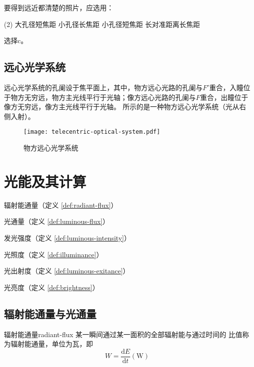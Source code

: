 \documentclass[cn,10pt,chinesefont=founder,math=mtpro2,cite=super,toc=onecol,twoside,openany]{elegantbook}
\begin{document}
\begin{problem}
	要得到远近都清楚的照片，应选用： 
	\begin{tasks}(2)
		\task 大孔径短焦距
		\task 小孔径长焦距
		\task 小孔径短焦距
		\task 长对准距离长焦距
	\end{tasks}
\end{problem}
\begin{solution}
	选择c。
\end{solution}

\section{远心光学系统}
远心光学系统的孔阑设于焦平面上，其中，物方远心光路的孔阑与$F'$重合，入瞳位于物方无穷远，物方主光线平行于光轴；像方远心光路的孔阑与$F$重合，出瞳位于像方无穷远，像方主光线平行于光轴。 所示的是一种物方远心光学系统（光从右侧入射）。

\begin{figure}[htbp]
	\centering
	\texttt{[image: telecentric-optical-system.pdf]}
	\caption{物方远心光学系统}
	\label{fig:telecentric-optical-system}
\end{figure}

\chapter{光能及其计算}

\begin{introduction}
	\item 辐射能通量（定义 \ref{def:radiant-flux}）
	\item 光通量（定义 \ref{def:luminous-flux}）
	\item 发光强度（定义 \ref{def:luminous-intensity}）
	\item 光照度（定义 \ref{def:illuminance}）
	\item 光出射度（定义 \ref{def:luminous-exitance}）
	\item 光亮度（定义 \ref{def:brightness}）
\end{introduction}

\section{辐射能通量与光通量}

\begin{definition}{辐射能通量}{radiant-flux}
	某一瞬间通过某一面积的全部辐射能与通过时间的 比值称为辐射能通量，单位为瓦，即
	\begin{equation}
	W=\frac{\mathrm{d}E}{\mathrm{d}t}(\mathrm{W})
	\end{equation}
\end{definition}
\end{document}
